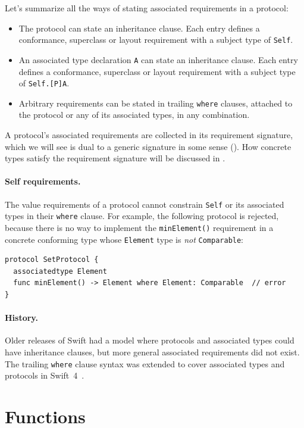 \documentclass[../generics]{subfiles}
\begin{document}
Let's summarize all the ways of stating associated requirements in a protocol:
\begin{itemize}
\item The protocol can state an inheritance clause. Each entry defines a conformance, superclass or layout requirement with a subject type of \texttt{Self}.
\item An associated type declaration \texttt{A} can state an inheritance clause. Each entry defines a conformance, superclass or layout requirement with a subject type of \texttt{Self.[P]A}.
\item Arbitrary requirements can be stated in trailing \texttt{where} clauses, attached to the protocol or any of its associated types, in any combination.
\end{itemize}

A protocol's associated requirements are collected in its requirement signature, which we will see is dual to a generic signature in some sense (). How concrete types satisfy the requirement signature will be discussed in .

\paragraph{Self requirements.}
The value requirements of a protocol cannot constrain \texttt{Self} or its associated types in their \texttt{where} clause. For example, the following protocol is rejected, because there is no way to implement the \texttt{minElement()} requirement in a concrete conforming type whose \texttt{Element} type is \emph{not} \texttt{Comparable}:
\begin{Verbatim}
protocol SetProtocol {
  associatedtype Element
  func minElement() -> Element where Element: Comparable  // error
}
\end{Verbatim}

\paragraph{History.}
Older releases of Swift had a model where protocols and associated types could have inheritance clauses, but more general associated requirements did not exist. The trailing \texttt{where} clause syntax was extended to cover associated types and protocols in Swift~4~\cite{se0142}.

\section{Functions}\label{function decls}
\end{document}
